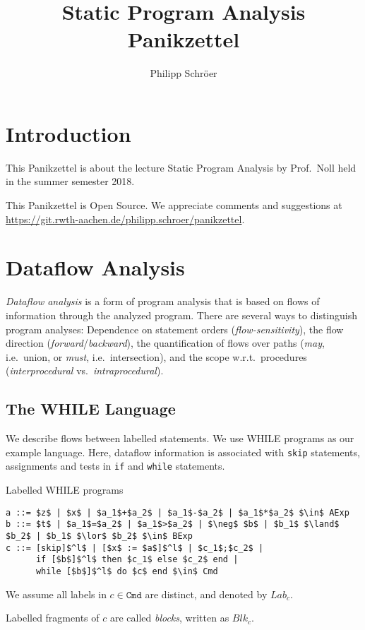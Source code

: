 \documentclass[english]{panikzettel}
\title{Static Program Analysis Panikzettel}
\author{Philipp Schröer}
\begin{document}
\maketitle

\tableofcontents

\newpage
\section{Introduction}

This Panikzettel is about the lecture Static Program Analysis by Prof.\ Noll held in the summer semester 2018.

This Panikzettel is Open Source. We appreciate comments and suggestions at \\ \url{https://git.rwth-aachen.de/philipp.schroer/panikzettel}.

\section{Dataflow Analysis}

\emph{Dataflow analysis} is a form of program analysis that is based on flows of information through the analyzed program.
There are several ways to distinguish program analyses: Dependence on statement orders (\emph{flow-sensitivity}), the flow direction (\emph{forward}/\emph{backward}), the quantification of flows over paths (\emph{may}, i.e.\ union, or \emph{must}, i.e.\ intersection), and the scope w.r.t.\ procedures (\emph{interprocedural} vs.\ \emph{intraprocedural}).

\subsection{The WHILE Language}

We describe flows between labelled statements.
We use WHILE programs as our example language.
Here, dataflow information is associated with \texttt{skip} statements, assignments and tests in \texttt{if} and \texttt{while} statements.

\begin{defi}{Labelled WHILE programs}
\begin{lstlisting}
a ::= $z$ | $x$ | $a_1$+$a_2$ | $a_1$-$a_2$ | $a_1$*$a_2$ $\in$ AExp
b ::= $t$ | $a_1$=$a_2$ | $a_1$>$a_2$ | $\neg$ $b$ | $b_1$ $\land$ $b_2$ | $b_1$ $\lor$ $b_2$ $\in$ BExp
c ::= [skip]$^l$ | [$x$ := $a$]$^l$ | $c_1$;$c_2$ |
      if [$b$]$^l$ then $c_1$ else $c_2$ end |
      while [$b$]$^l$ do $c$ end $\in$ Cmd
\end{lstlisting}

We assume all labels in $c \in \texttt{Cmd}$ are distinct, and denoted by $Lab_c$.

Labelled fragments of $c$ are called \emph{blocks}, written as $Blk_c$.
\end{defi}
\end{document}

